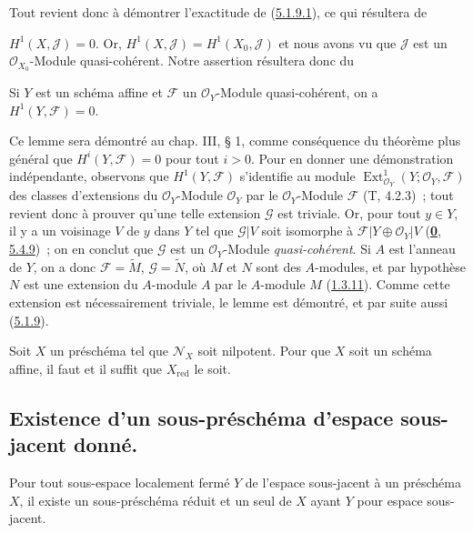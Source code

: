 Tout revient donc à démontrer l'exactitude de
(\hyperref[I.5.1.9.1-fr]{5.1.9.1}), ce qui résultera de

$H^1(X,\mathscr{J})=0$. Or,
$H^1(X,\mathscr{J})=H^1(X_0,\mathscr{J})$ et nous avons vu que
$\mathscr{J}$ est un $\mathscr{O}_{X_0}$-Module quasi-cohérent. Notre
assertion résultera donc du

\begin{lemma}[5.1.9.2]
\label{I.5.1.9.2-fr}
Si $Y$ est un schéma affine et $\mathscr{F}$ un $\mathscr{O}_Y$-Module
quasi-cohérent, on a $H^1(Y,\mathscr{F})=0$.
\end{lemma}

Ce lemme sera démontré au chap. III, § 1, comme conséquence du théorème plus
général que $H^i(Y,\mathscr{F})=0$ pour tout $i>0$. Pour en donner une
démonstration indépendante, observons que $H^1(Y,\mathscr{F})$ s'identifie au
module $\operatorname{Ext}^1_{\mathscr{O}_Y}
(Y;\mathscr{O}_Y,\mathscr{F})$ des classes d'extensions du
$\mathscr{O}_Y$-Module $\mathscr{O}_Y$ par le $\mathscr{O}_Y$-Module
$\mathscr{F}$ (T, 4.2.3)~; tout revient donc à prouver qu'une telle extension
$\mathscr{G}$ est triviale. Or, pour tout $y\in Y$, il y a un voisinage $V$
de $y$ dans $Y$ tel que $\mathscr{G}|V$ soit isomorphe à
$\mathscr{F}|Y\oplus\mathscr{O}_Y|V$
(\hyperref[0.5.4.9-fr]{\textbf{0}, 5.4.9})~; on en conclut que $\mathscr{G}$ est un
$\mathscr{O}_Y$-Module \emph{quasi-cohérent}. Si $A$ est l'anneau de $Y$, on a donc
$\mathscr{F}=\widetilde{M}$, $\mathscr{G}=\widetilde{N}$, où $M$ et $N$ sont
des $A$-modules, et par hypothèse $N$ est une extension du $A$-module $A$ par
le $A$-module $M$ (\hyperref[I.1.3.11-fr]{1.3.11}). Comme cette extension est
nécessairement triviale, le lemme est démontré, et par suite aussi
(\hyperref[I.5.1.9-fr]{5.1.9}).

\begin{corollary}[5.1.10]
\label{I.5.1.10-fr}
Soit $X$ un préschéma tel que $\mathscr{N}_X$ soit nilpotent. Pour que $X$
soit un schéma affine, il faut et il suffit que $X_{\mathrm{red}}$ le soit.
\end{corollary}

\subsection{Existence d'un sous-préschéma d'espace sous-jacent donné.}
\label{subsection:I.5.2-fr}

\begin{proposition}[5.2.1]
\label{I.5.2.1-fr}
Pour tout sous-espace localement fermé $Y$ de l'espace sous-jacent à un
préschéma $X$, il existe un sous-préschéma réduit et un seul de $X$ ayant $Y$
pour espace sous-jacent.
\end{proposition}


